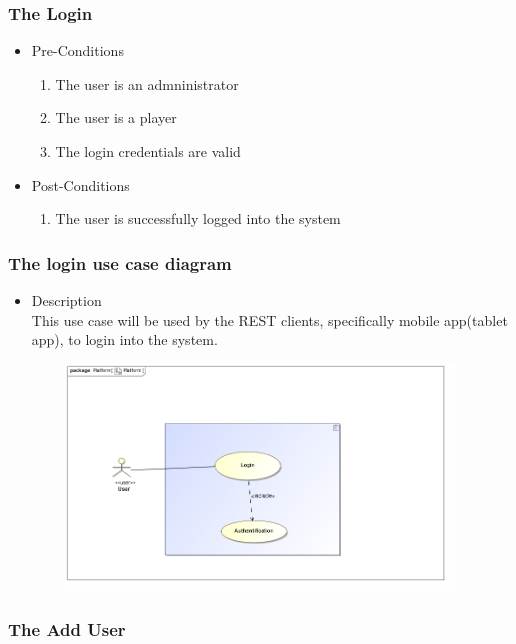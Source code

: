 \documentclass[english]{article}
\begin{document}
		\subsubsection{The Login}
		\begin{itemize}
	
		
		\item Pre-Conditions
			\begin{enumerate}
				\item The user is an admninistrator
				\item The user is a player
				\item The login credentials are valid
			\end{enumerate}
		\item Post-Conditions
			\begin{enumerate}
			\item The user is successfully logged into the system
						
			\end{enumerate}
		
			
		

\end{itemize}

		\subsubsection* {The login use case diagram}
		\begin{itemize}
			\item Description\\
			This use case will be used by the REST clients, specifically mobile app(tablet app), to login into the system.
		\end{itemize}
		\includegraphics[width=14cm,height=6cm,keepaspectratio]{login.jpg}\\
		
		
		\subsubsection{The Add User}
		
\end{document}
